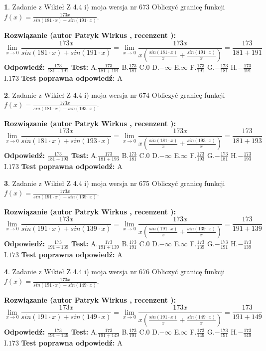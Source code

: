 \documentclass[12pt, a4paper]{article}
\theoremstyle{definition} %
\newtheorem{zad}{}
\newcommand{\zadStart}[1]{\begin{zad}#1\newline}
\newcommand{\zadStop}{\end{zad}}
\newcommand{\rozwStart}[2]{\noindent \textbf{Rozwiązanie (autor #1 , recenzent #2): }\newline}
\newcommand{\rozwStop}{\newline}
\newcommand{\odpStart}{\noindent \textbf{Odpowiedź:}\newline}
\newcommand{\odpStop}{\newline}
\newcommand{\testStart}{\noindent \textbf{Test:}\newline}
\newcommand{\testStop}{\newline}
\newcommand{\kluczStart}{\noindent \textbf{Test poprawna odpowiedź:}\newline}
\newcommand{\kluczStop}{\newline}
\begin{document}
\zadStart{Zadanie z Wikieł Z 4.4 i) moja wersja nr 673}
Obliczyć granicę funkcji $f(x)=\frac{173x}{sin(181\cdot x) +sin(191\cdot x)}$.
\zadStop
\rozwStart{Patryk Wirkus}{}
$$\lim\limits_{x\to 0}\frac{173x}{sin(181\cdot x) +sin(191\cdot x)}=\lim\limits_{x\to 0}\frac{173x}{x(\frac{sin(181\cdot x)}{x}+\frac{sin(191\cdot x)}{x})}=\frac{173}{181+191}$$
\rozwStop
\odpStart
$\frac{173}{181+191}$
\odpStop
\testStart
A.$\frac{173}{181+191}$
B.$\frac{173}{181}$
C.$0$
D.$-\infty$
E.$\infty$
F.$\frac{173}{191}$
G.$-\frac{173}{181}$
H.$-\frac{173}{191}$
I.$173$
\testStop
\kluczStart
A
\kluczStop



\zadStart{Zadanie z Wikieł Z 4.4 i) moja wersja nr 674}
Obliczyć granicę funkcji $f(x)=\frac{173x}{sin(181\cdot x) +sin(193\cdot x)}$.
\zadStop
\rozwStart{Patryk Wirkus}{}
$$\lim\limits_{x\to 0}\frac{173x}{sin(181\cdot x) +sin(193\cdot x)}=\lim\limits_{x\to 0}\frac{173x}{x(\frac{sin(181\cdot x)}{x}+\frac{sin(193\cdot x)}{x})}=\frac{173}{181+193}$$
\rozwStop
\odpStart
$\frac{173}{181+193}$
\odpStop
\testStart
A.$\frac{173}{181+193}$
B.$\frac{173}{181}$
C.$0$
D.$-\infty$
E.$\infty$
F.$\frac{173}{193}$
G.$-\frac{173}{181}$
H.$-\frac{173}{193}$
I.$173$
\testStop
\kluczStart
A
\kluczStop



\zadStart{Zadanie z Wikieł Z 4.4 i) moja wersja nr 675}
Obliczyć granicę funkcji $f(x)=\frac{173x}{sin(191\cdot x) +sin(139\cdot x)}$.
\zadStop
\rozwStart{Patryk Wirkus}{}
$$\lim\limits_{x\to 0}\frac{173x}{sin(191\cdot x) +sin(139\cdot x)}=\lim\limits_{x\to 0}\frac{173x}{x(\frac{sin(191\cdot x)}{x}+\frac{sin(139\cdot x)}{x})}=\frac{173}{191+139}$$
\rozwStop
\odpStart
$\frac{173}{191+139}$
\odpStop
\testStart
A.$\frac{173}{191+139}$
B.$\frac{173}{191}$
C.$0$
D.$-\infty$
E.$\infty$
F.$\frac{173}{139}$
G.$-\frac{173}{191}$
H.$-\frac{173}{139}$
I.$173$
\testStop
\kluczStart
A
\kluczStop



\zadStart{Zadanie z Wikieł Z 4.4 i) moja wersja nr 676}
Obliczyć granicę funkcji $f(x)=\frac{173x}{sin(191\cdot x) +sin(149\cdot x)}$.
\zadStop
\rozwStart{Patryk Wirkus}{}
$$\lim\limits_{x\to 0}\frac{173x}{sin(191\cdot x) +sin(149\cdot x)}=\lim\limits_{x\to 0}\frac{173x}{x(\frac{sin(191\cdot x)}{x}+\frac{sin(149\cdot x)}{x})}=\frac{173}{191+149}$$
\rozwStop
\odpStart
$\frac{173}{191+149}$
\odpStop
\testStart
A.$\frac{173}{191+149}$
B.$\frac{173}{191}$
C.$0$
D.$-\infty$
E.$\infty$
F.$\frac{173}{149}$
G.$-\frac{173}{191}$
H.$-\frac{173}{149}$
I.$173$
\testStop
\kluczStart
A
\kluczStop
\end{document}
